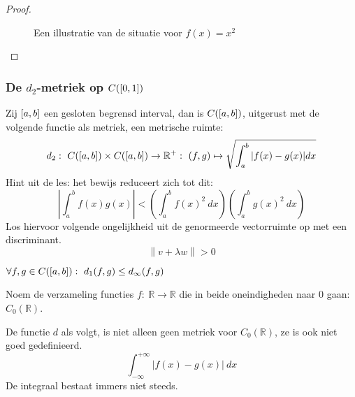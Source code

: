 \documentclass[main.tex]{subfiles}
\begin{document}
\begin{vb}
\begin{proof}
\begin{itemize}
\begin{figure}[H]
      \caption{ Een illustratie van de situatie voor $f(x) = x^{2}$}
    \end{figure}
    \end{itemize}
  \end{proof}
\end{vb}

\subsubsection{De $d_2$-metriek op $C(\interval{0}{1})$}
\label{sec:de-d_2-metriek}

\begin{vb}
  Zij $\interval{a}{b}$ een gesloten begrensd interval, dan is $C(\interval{a}{b})$, uitgerust met de volgende functie als metriek, een metrische ruimte:
  \[ d_{2}:\ C(\interval{a}{b})\times C(\interval{a}{b}) \rightarrow \mathbb{R}^{+}:\ (f,g) \mapsto \sqrt{\int_{a}^{b}|f(x)-g(x)|dx} \]
  Hint uit de les: het bewijs reduceert zich tot dit:
  \[ \left|\int_{a}^{b}f(x)g(x)\right| < \left(\int_{a}^{b}f(x)^{2}\ dx \right) \left(\int_{a}^{b}g(x)^{2}\ dx \right) \]
  Los hiervoor volgende ongelijkheid uit de genormeerde vectorruimte op met een discriminant.
  \[ \left\| v+\lambda w \right\| > 0 \]
\end{vb}

\begin{st}
  $\forall f,g \in C(\interval{a}{b}):\ d_{1}(f,g) \le d_{\infty}(f,g)$
\end{st}

\begin{de}
  Noem de verzameling functies $f:\ \mathbb{R} \rightarrow \mathbb{R}$ die in beide oneindigheden naar $0$ gaan: $C_{0}(\mathbb{R})$.
\end{de}

\begin{vb}
  De functie $d$ als volgt, is niet alleen geen metriek voor $C_{0}(\mathbb{R})$, ze is ook niet goed gedefinieerd.
  \[ \int_{-\infty}^{+\infty}|f(x)-g(x)|\ dx \]
  De integraal bestaat immers niet steeds.
\end{vb}
\end{document}
